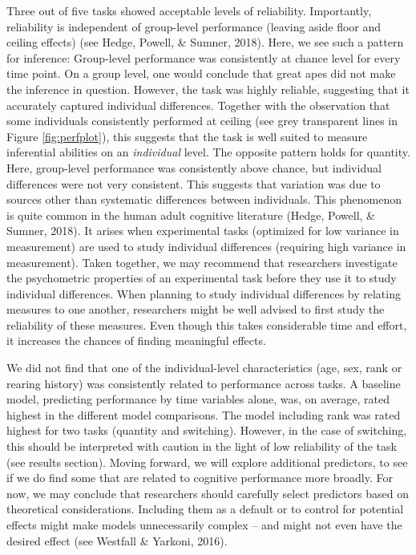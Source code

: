 \documentclass[10pt, letterpaper]{article}
\begin{document}
Three out of five tasks showed acceptable levels of reliability.
Importantly, reliability is independent of group-level performance
(leaving aside floor and ceiling effects) (see Hedge, Powell, \& Sumner,
2018). Here, we see such a pattern for inference: Group-level
performance was consistently at chance level for every time point. On a
group level, one would conclude that great apes did not make the
inference in question. However, the task was highly reliable, suggesting
that it accurately captured individual differences. Together with the
observation that some individuals consistently performed at ceiling (see
grey transparent lines in Figure \ref{fig:perfplot}), this suggests that
the task is well suited to measure inferential abilities on an
\emph{individual} level. The opposite pattern holds for quantity. Here,
group-level performance was consistently above chance, but individual
differences were not very consistent. This suggests that variation was
due to sources other than systematic differences between individuals.
This phenomenon is quite common in the human adult cognitive literature
(Hedge, Powell, \& Sumner, 2018). It arises when experimental tasks
(optimized for low variance in measurement) are used to study individual
differences (requiring high variance in measurement). Taken together, we
may recommend that researchers investigate the psychometric properties
of an experimental task before they use it to study individual
differences. When planning to study individual differences by relating
measures to one another, researchers might be well advised to first
study the reliability of these measures. Even though this takes
considerable time and effort, it increases the chances of finding
meaningful effects.

We did not find that one of the individual-level characteristics (age,
sex, rank or rearing history) was consistently related to performance
across tasks. A baseline model, predicting performance by time variables
alone, was, on average, rated highest in the different model
comparisons. The model including rank was rated highest for two tasks
(quantity and switching). However, in the case of switching, this should
be interpreted with caution in the light of low reliability of the task
(see results section). Moving forward, we will explore additional
predictors, to see if we do find some that are related to cognitive
performance more broadly. For now, we may conclude that researchers
should carefully select predictors based on theoretical considerations.
Including them as a default or to control for potential effects might
make models unnecessarily complex -- and might not even have the desired
effect (see Westfall \& Yarkoni, 2016).
\end{document}
